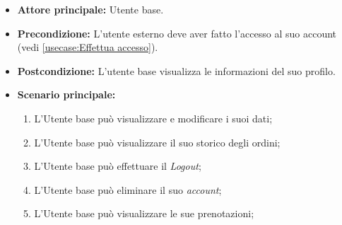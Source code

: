 \label{usecase:Visualizza profilo}
\begin{itemize}
	\item \textbf{Attore principale:} Utente base.

	\item \textbf{Precondizione:} L'utente esterno deve aver fatto l'accesso al suo account (vedi \autoref{usecase:Effettua accesso}).

	\item \textbf{Postcondizione:} L'utente base visualizza le informazioni del suo profilo.

	\item \textbf{Scenario principale:}
	      \begin{enumerate}
		      \item L'Utente base può visualizzare e modificare i suoi dati;
		      \item L'Utente base può visualizzare il suo storico degli ordini;
		      \item L'Utente base può effettuare il \textit{Logout};
		      \item L'Utente base può eliminare il suo \textit{account};
		      \item L'Utente base può visualizzare le sue prenotazioni;
	      \end{enumerate}
\end{itemize}
